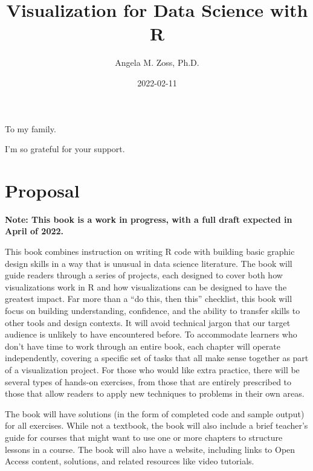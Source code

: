 \documentclass[
]{krantz}
\title{Visualization for Data Science with R}
\author{Angela M. Zoss, Ph.D.}
\date{2022-02-11}
\begin{document}
\maketitle


\thispagestyle{empty}

\begin{center}
To my family.

I'm so grateful for your support.
\end{center}

\setlength{\abovedisplayskip}{-5pt}
\setlength{\abovedisplayshortskip}{-5pt}

{
\hypersetup{linkcolor=}
\setcounter{tocdepth}{2}
\tableofcontents
}
\listoftables
\listoffigures
\hypertarget{proposal}{%
\chapter*{Proposal}\label{proposal}}


\textbf{Note: This book is a work in progress, with a full draft expected in April of 2022.}

This book combines instruction on writing R code with building basic graphic design skills in a way that is unusual in data science literature. The book will guide readers through a series of projects, each designed to cover both how visualizations work in R and how visualizations can be designed to have the greatest impact. Far more than a ``do this, then this'' checklist, this book will focus on building understanding, confidence, and the ability to transfer skills to other tools and design contexts. It will avoid technical jargon that our target audience is unlikely to have encountered before. To accommodate learners who don't have time to work through an entire book, each chapter will operate independently, covering a specific set of tasks that all make sense together as part of a visualization project. For those who would like extra practice, there will be several types of hands-on exercises, from those that are entirely prescribed to those that allow readers to apply new techniques to problems in their own areas.

The book will have solutions (in the form of completed code and sample output) for all exercises. While not a textbook, the book will also include a brief teacher's guide for courses that might want to use one or more chapters to structure lessons in a course. The book will also have a website, including links to Open Access content, solutions, and related resources like video tutorials.
\end{document}
